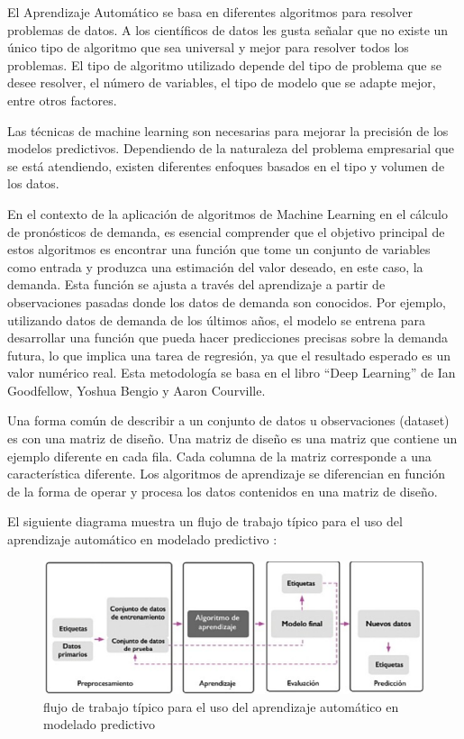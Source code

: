 \vspace{1\baselineskip}
El Aprendizaje Automático se basa en diferentes algoritmos para resolver problemas de datos. A los científicos de datos les gusta señalar que no existe un único tipo de algoritmo que sea universal y mejor para resolver todos los problemas. El tipo de algoritmo utilizado depende del tipo de problema que se desee resolver, el número de variables, el tipo de modelo que se adapte mejor, entre otros factores. 

Las técnicas de machine learning son necesarias para mejorar la precisión de los modelos predictivos. Dependiendo de la naturaleza del problema empresarial que se está atendiendo, existen diferentes enfoques basados en el tipo y volumen de los datos\cite{ibm}.

En el contexto de la aplicación de algoritmos de Machine Learning en el cálculo de pronósticos de demanda, es esencial comprender que el objetivo principal de estos algoritmos es encontrar una función que tome un conjunto de variables como entrada y produzca una estimación del valor deseado, en este caso, la demanda. Esta función se ajusta a través del aprendizaje a partir de observaciones pasadas donde los datos de demanda son conocidos. Por ejemplo, utilizando datos de demanda de los últimos años, el modelo se entrena para desarrollar una función que pueda hacer predicciones precisas sobre la demanda futura, lo que implica una tarea de regresión, ya que el resultado esperado es un valor numérico real. Esta metodología se basa en el libro “Deep Learning” de Ian Goodfellow, Yoshua Bengio y Aaron Courville\cite{goodfellow2016deep}.

Una forma común de describir a un conjunto de datos u observaciones (dataset) es con una matriz de diseño. Una matriz de diseño es una matriz que contiene un ejemplo diferente en cada fila. Cada columna de la matriz corresponde a una característica diferente. Los algoritmos de aprendizaje se diferencian en función de la forma de operar y procesa los datos contenidos en una matriz de diseño\cite{arana2021redes}.

El siguiente diagrama muestra un flujo de trabajo típico para el uso del aprendizaje automático en modelado predictivo \cite{mirjalili2020python}:

\begin{figure}[H]
  \begin{center}
    \includegraphics[scale=0.80]{./uso_aprendisaje_automatico.png}
    \caption{ flujo de trabajo típico para el uso del aprendizaje automático en modelado predictivo}
    \label{fig:perceptron}
  \end{center}
\end{figure}

